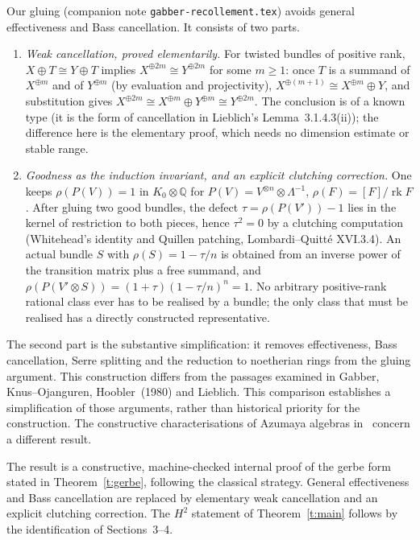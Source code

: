 \documentclass[11pt]{amsart}
\theoremstyle{definition}
\theoremstyle{remark}
\newcommand{\code}[1]{\texttt{#1}}
\begin{document}
Our gluing (companion note \code{gabber-recollement.tex}) avoids general
effectiveness and Bass cancellation. It consists of two parts.
\begin{enumerate}
\item \emph{Weak cancellation, proved elementarily.} For twisted bundles of
  positive rank, $X\oplus T\cong Y\oplus T$ implies
  $X^{\oplus2m}\cong Y^{\oplus2m}$ for some $m\geq1$: once $T$ is a
  summand of $X^{\oplus m}$ and of $Y^{\oplus m}$ (by evaluation and
  projectivity), $X^{\oplus(m+1)}\cong X^{\oplus m}\oplus Y$, and
  substitution gives
  $X^{\oplus2m}\cong X^{\oplus m}\oplus Y^{\oplus m}\cong Y^{\oplus2m}$.
  The conclusion is of a known type (it is the form of cancellation in
  Lieblich's Lemma~3.1.4.3(ii)); the difference here is the elementary
  proof, which needs no dimension estimate or stable range.
\item \emph{Goodness as the induction invariant, and an explicit clutching
  correction.} One keeps $\rho(P(V))=1$ in $K_0\otimes\mathbb Q$ for
  $P(V)=V^{\otimes n}\otimes\Lambda^{-1}$, $\rho(F)=[F]/\operatorname{rk}F$. After
  gluing two good bundles, the defect $\tau=\rho(P(V'))-1$ lies in the kernel
  of restriction to both pieces, hence $\tau^2=0$ by a clutching computation
  (Whitehead's identity and Quillen patching, Lombardi--Quitt\'e XVI.3.4). An
  actual bundle $S$ with $\rho(S)=1-\tau/n$ is obtained from an inverse power of
  the transition matrix plus a free summand, and
  $\rho(P(V'\otimes S))=(1+\tau)(1-\tau/n)^n=1$. No arbitrary positive-rank
  rational class ever has to be realised by a bundle; the only class that must
  be realised has a directly constructed representative.
\end{enumerate}
The second part is the substantive simplification: it removes effectiveness,
Bass cancellation, Serre splitting and the reduction to noetherian rings from the
gluing argument. This construction differs from the passages examined in
Gabber, Knus--Ojanguren, Hoobler~(1980) and Lieblich. This comparison
establishes a simplification of those arguments, rather than historical
priority for the construction. The constructive characterisations of
Azumaya algebras in~\cite{CLN} concern a different result.

The result is a constructive, machine-checked internal proof of the gerbe
form stated in Theorem~\ref{t:gerbe}, following the classical strategy.
General effectiveness and Bass cancellation are replaced by elementary weak
cancellation and an explicit clutching correction. The $H^2$ statement of
Theorem~\ref{t:main} follows by the identification of Sections~3--4.
\end{document}
